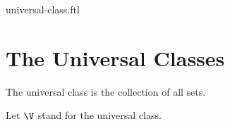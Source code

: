 \documentclass{naproche-library}
\begin{document}
\begin{smodule}{universal-class.ftl}


  \section*{The Universal Classes}

  \begin{definition}[forthel,id=FOUNDATIONS_10_9625487120366325]
    The universal class is the collection of all sets.

    Let $\V$ stand for the universal class.
  \end{definition}
\end{smodule}
\end{document}

